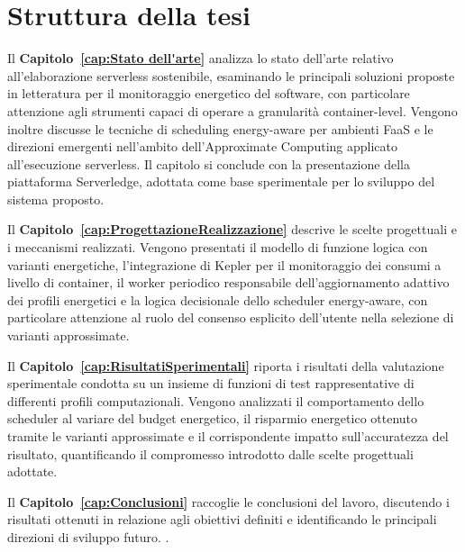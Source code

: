 \section{Struttura della tesi}
\label{sec:struttura}

Il \textbf{Capitolo~\ref{cap:Stato dell'arte}} analizza lo stato dell'arte
relativo all'elaborazione serverless sostenibile, esaminando le
principali soluzioni proposte in letteratura per il monitoraggio
energetico del software, con particolare attenzione agli strumenti
capaci di operare a granularità container-level. Vengono inoltre
discusse le tecniche di scheduling energy-aware per ambienti FaaS
e le direzioni emergenti nell'ambito dell'Approximate Computing
applicato all'esecuzione serverless. Il capitolo si conclude con
la presentazione della piattaforma Serverledge, adottata come base
sperimentale per lo sviluppo del sistema proposto.

Il \textbf{Capitolo~\ref{cap:ProgettazioneRealizzazione}} descrive le scelte
progettuali e i meccanismi realizzati. Vengono presentati il modello
di funzione logica con varianti energetiche, l'integrazione di Kepler
per il monitoraggio dei consumi a livello di container, il worker
periodico responsabile dell'aggiornamento adattivo dei profili
energetici e la logica decisionale dello scheduler energy-aware,
con particolare attenzione al ruolo del consenso esplicito
dell'utente nella selezione di varianti approssimate.

Il \textbf{Capitolo~\ref{cap:RisultatiSperimentali}} riporta i risultati
della valutazione sperimentale condotta su un insieme di funzioni
di test rappresentative di differenti profili computazionali.
Vengono analizzati il comportamento dello scheduler al variare
del budget energetico, il risparmio energetico ottenuto tramite
le varianti approssimate e il corrispondente impatto sull'accuratezza
del risultato, quantificando il compromesso introdotto dalle
scelte progettuali adottate.

Il \textbf{Capitolo~\ref{cap:Conclusioni}} raccoglie le conclusioni
del lavoro, discutendo i risultati ottenuti in relazione agli
obiettivi definiti e identificando le principali direzioni di
sviluppo futuro.
.
